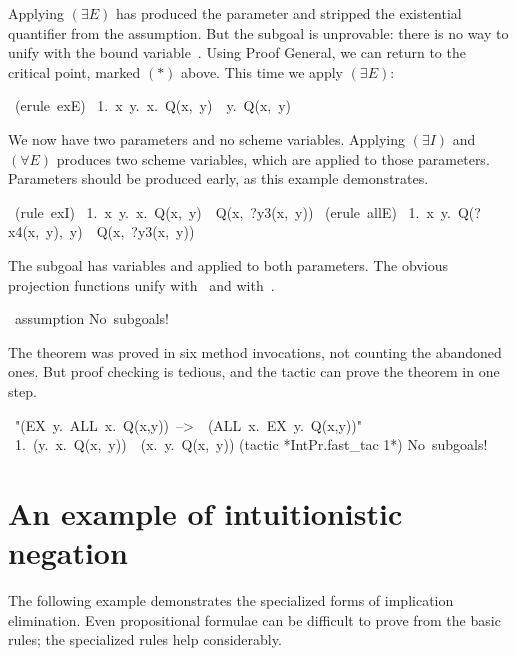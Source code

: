 Applying $(\exists E)$ has produced the parameter  and stripped the
existential quantifier from the assumption.  But the subgoal is unprovable:
there is no way to unify  with the bound variable~.
Using Proof General, we can return to the critical point, marked
$(*)$ above.  This time we apply $({\exists}E)$:
\begin{isabelle}
\ (erule\ exE)\isanewline
\ 1.\ \isasymAnd x\ y.\ \isasymforall x.\ Q(x,\ y)\
\isasymLongrightarrow \ \isasymexists y.\ Q(x,\ y)
\end{isabelle}
We now have two parameters and no scheme variables.  Applying
$({\exists}I)$ and $({\forall}E)$ produces two scheme variables, which are
applied to those parameters.  Parameters should be produced early, as this
example demonstrates.
\begin{isabelle}
\ (rule\ exI)\isanewline
\ 1.\ \isasymAnd x\ y.\ \isasymforall x.\ Q(x,\ y)\
\isasymLongrightarrow \ Q(x,\ ?y3(x,\ y))
\isanewline
{}\ (erule\ allE)\isanewline
\ 1.\ \isasymAnd x\ y.\ Q(?x4(x,\ y),\ y)\ \isasymLongrightarrow \
Q(x,\ ?y3(x,\ y))
\end{isabelle}
The subgoal has variables \isa{?y3} and \isa{?x4} applied to both
parameters.  The obvious projection functions unify  with~\isa{
x} and  with~.
\begin{isabelle}
\isacommand{apply}\ assumption\isanewline
No\ subgoals!\isanewline
\isacommand{done}
\end{isabelle}
The theorem was proved in six method invocations, not counting the
abandoned ones.  But proof checking is tedious, and the \ML{} tactic
 can prove the theorem in one step.
\begin{isabelle}
\isacommand{lemma}\ "(EX\ y.\ ALL\ x.\ Q(x,y))\ -->\ \ (ALL\ x.\ EX\ y.\ Q(x,y))"\isanewline
\ 1.\ (\isasymexists y.\ \isasymforall x.\ Q(x,\ y))\
\isasymlongrightarrow \ (\isasymforall x.\ \isasymexists y.\ Q(x,\ y))
\isanewline
\isacommand{by} (tactic {*IntPr.fast_tac 1*})\isanewline
No\ subgoals!
\end{isabelle}


\section{An example of intuitionistic negation}
The following example demonstrates the specialized forms of implication
elimination.  Even propositional formulae can be difficult to prove from
the basic rules; the specialized rules help considerably.  

